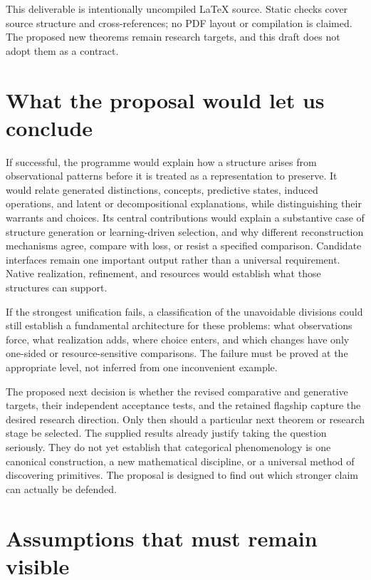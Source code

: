 \documentclass[11pt]{article}
\theoremstyle{remark}
\begin{document}
This deliverable is intentionally uncompiled \LaTeX{} source. Static checks cover source structure and cross-references; no PDF layout or compilation is claimed. The proposed new theorems remain research targets, and this draft does not adopt them as a contract.

\section{What the proposal would let us conclude}
\label{sec:conclusion}

If successful, the programme would explain how a structure arises from observational patterns before it is treated as a representation to preserve. It would relate generated distinctions, concepts, predictive states, induced operations, and latent or decompositional explanations, while distinguishing their warrants and choices. Its central contributions would explain a substantive case of structure generation or learning-driven selection, and why different reconstruction mechanisms agree, compare with loss, or resist a specified comparison. Candidate interfaces remain one important output rather than a universal requirement. Native realization, refinement, and resources would establish what those structures can support.

If the strongest unification fails, a classification of the unavoidable divisions could still establish a fundamental architecture for these problems: what observations force, what realization adds, where choice enters, and which changes have only one-sided or resource-sensitive comparisons. The failure must be proved at the appropriate level, not inferred from one inconvenient example.

The proposed next decision is whether the revised comparative and generative targets, their independent acceptance tests, and the retained flagship capture the desired research direction. Only then should a particular next theorem or research stage be selected. The supplied results already justify taking the question seriously. They do not yet establish that categorical phenomenology is one canonical construction, a new mathematical discipline, or a universal method of discovering primitives. The proposal is designed to find out which stronger claim can actually be defended.

\appendix
\section{Assumptions that must remain visible}
\label{app:assumptions}
\end{document}
